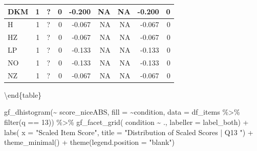 \documentclass[
  letterpaper,
  DIV=11,
  numbers=noendperiod]{scrreprt}
\newenvironment{Shaded}{\begin{snugshade}}{\end{snugshade}}
\newcommand{\AttributeTok}[1]{\textcolor[rgb]{0.40,0.45,0.13}{#1}}
\newcommand{\DecValTok}[1]{\textcolor[rgb]{0.68,0.00,0.00}{#1}}
\newcommand{\FunctionTok}[1]{\textcolor[rgb]{0.28,0.35,0.67}{#1}}
\newcommand{\NormalTok}[1]{\textcolor[rgb]{0.00,0.23,0.31}{#1}}
\newcommand{\SpecialCharTok}[1]{\textcolor[rgb]{0.37,0.37,0.37}{#1}}
\newcommand{\StringTok}[1]{\textcolor[rgb]{0.13,0.47,0.30}{#1}}
\begin{document}
\begin{tabular}[t]{l|r|l|r|r|r|r|r|r}
\hline
\hspace{1em}DKM & 1 & ? & 0 & -0.200 & NA & NA & -0.200 & 0\\
\hline
\hspace{1em}H & 1 & ? & 0 & -0.067 & NA & NA & -0.067 & 0\\
\hline
\hspace{1em}HZ & 1 & ? & 0 & -0.067 & NA & NA & -0.067 & 0\\
\hline
\hspace{1em}LP & 1 & ? & 0 & -0.133 & NA & NA & -0.133 & 0\\
\hline
\hspace{1em}NO & 1 & ? & 0 & -0.133 & NA & NA & -0.133 & 0\\
\hline
\hspace{1em}NZ & 1 & ? & 0 & -0.067 & NA & NA & -0.067 & 0\\
\hline
\end{tabular}

\textbackslash end\{table\}

\begin{Shaded}
\begin{Highlighting}[]
\FunctionTok{gf\_dhistogram}\NormalTok{(}\SpecialCharTok{\textasciitilde{}}\NormalTok{ score\_niceABS, }\AttributeTok{fill =} \SpecialCharTok{\textasciitilde{}}\NormalTok{condition, }\AttributeTok{data =}\NormalTok{ df\_items }\SpecialCharTok{\%\textgreater{}\%} \FunctionTok{filter}\NormalTok{(q }\SpecialCharTok{==} \DecValTok{13}\NormalTok{)) }\SpecialCharTok{\%\textgreater{}\%} 
  \FunctionTok{gf\_facet\_grid}\NormalTok{( condition }\SpecialCharTok{\textasciitilde{}}\NormalTok{ ., }\AttributeTok{labeller =}\NormalTok{ label\_both) }\SpecialCharTok{+} 
  \FunctionTok{labs}\NormalTok{( }\AttributeTok{x =} \StringTok{"Scaled Item Score"}\NormalTok{, }\AttributeTok{title =} \StringTok{"Distribution of Scaled Scores | Q13 "}\NormalTok{) }\SpecialCharTok{+} 
  \FunctionTok{theme\_minimal}\NormalTok{() }\SpecialCharTok{+} \FunctionTok{theme}\NormalTok{(}\AttributeTok{legend.position =} \StringTok{"blank"}\NormalTok{)}
\end{Highlighting}
\end{Shaded}
\end{document}
